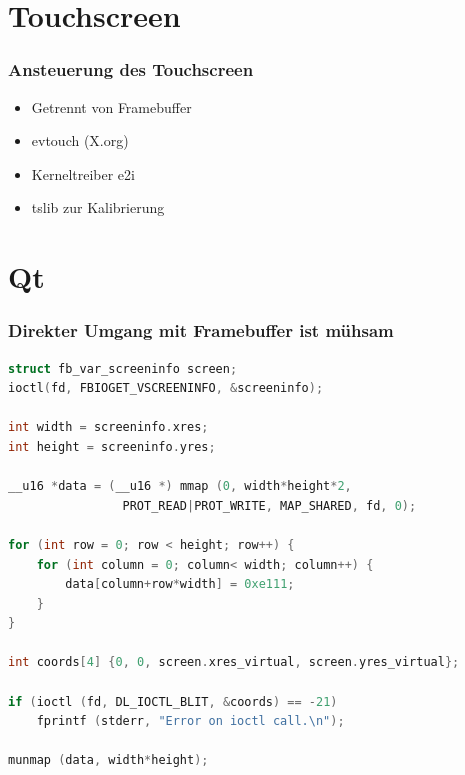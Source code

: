 \documentclass{beamer}
\begin{document}
  \section{Touchscreen}
	
	\begin{frame}
		\frametitle{Ansteuerung des Touchscreen}
		\begin{itemize}
			\item Getrennt von Framebuffer
			\item evtouch (X.org)
			\item Kerneltreiber e2i
			\item tslib zur Kalibrierung
		\end{itemize}
	\end{frame}	
	
	\section{Qt}
	
	\begin{frame}
  \frametitle{Direkter Umgang mit Framebuffer ist mühsam}
		\begin{lstlisting}[language=C, basicstyle=\scriptsize]
struct fb_var_screeninfo screen;
ioctl(fd, FBIOGET_VSCREENINFO, &screeninfo);

int width = screeninfo.xres;
int height = screeninfo.yres;

__u16 *data = (__u16 *) mmap (0, width*height*2, 
                PROT_READ|PROT_WRITE, MAP_SHARED, fd, 0);

for (int row = 0; row < height; row++) {
    for (int column = 0; column< width; column++) {
        data[column+row*width] = 0xe111;
    }
}

int coords[4] {0, 0, screen.xres_virtual, screen.yres_virtual};

if (ioctl (fd, DL_IOCTL_BLIT, &coords) == -21) 
    fprintf (stderr, "Error on ioctl call.\n");

munmap (data, width*height);
		\end{lstlisting}
	\end{frame}	
	
\end{document}
